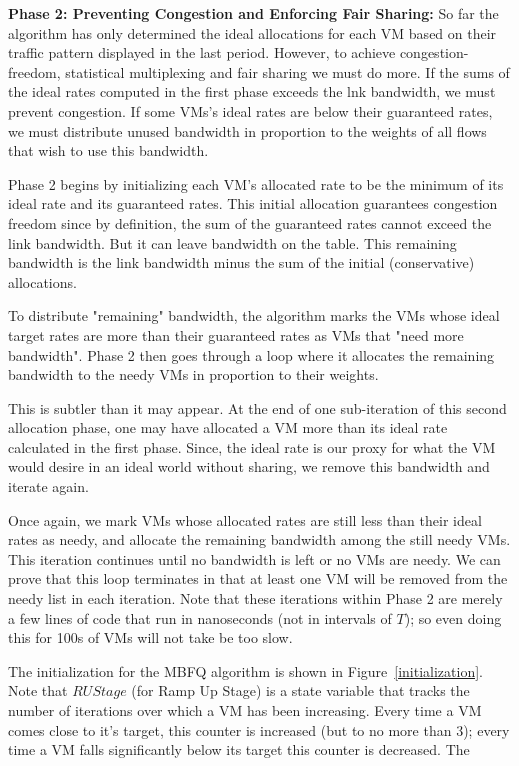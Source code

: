{\bf Phase 2:  Preventing Congestion and Enforcing Fair Sharing:}  So far the
algorithm has only determined the ideal allocations for each VM based on their
traffic pattern displayed in the last period.   However, to achieve
congestion-freedom, statistical multiplexing and fair sharing we must do more.
If the sums of the ideal rates computed in the first phase exceeds the lnk
bandwidth, we must prevent congestion.  If some VMs's ideal rates are below
their guaranteed rates, we must distribute unused bandwidth in proportion to the
weights of all flows that wish to use this bandwidth.  

Phase 2 begins by initializing each VM's allocated rate to be the minimum of its
ideal rate and its guaranteed rates.  This initial allocation guarantees
congestion freedom since by definition, the sum of the guaranteed rates cannot
exceed the link bandwidth.  But it can leave bandwidth on the table. This
remaining bandwidth is the link bandwidth minus the sum of the initial
(conservative) allocations.

To distribute "remaining" bandwidth, the algorithm marks the VMs whose ideal
target rates are more than their guaranteed rates as VMs that "need more
bandwidth".  Phase 2 then goes through a loop where it allocates the remaining
bandwidth to the needy VMs in proportion to their weights.  

This is subtler than it may appear.   At the end of one sub-iteration of this
second allocation phase, one may have allocated a VM more than its ideal rate
calculated in the first phase.  Since, the ideal rate is our proxy for what the
VM would desire in an ideal world without sharing, we remove this bandwidth and
iterate again.  

Once again, we mark VMs whose allocated rates are still less than their ideal
rates as needy, and allocate the remaining bandwidth among the still needy VMs.
This iteration continues until no bandwidth is left or no VMs are needy.   We
can prove that this loop terminates in that at least one VM will be removed from
the needy list in each iteration.  Note that these iterations within Phase 2 are
merely a few lines of code that run in nanoseconds (not in intervals of $T$); so
even doing this for 100s of VMs will not take be too slow.

The initialization for the MBFQ algorithm is shown in
Figure~\ref{initialization}.  Note that $RUStage$ (for Ramp Up Stage) is a state
variable that tracks the number of iterations over which a VM has been
increasing.  Every time a VM comes close to it's target, this counter is
increased (but to no more than $3$); every time a VM falls significantly below
its target this counter is decreased.  The 

